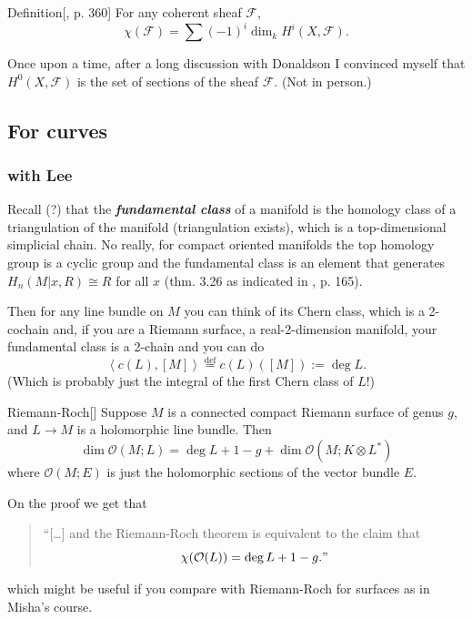 \begin{thing4}{Definition}[\cite{hart}, p. 360]\label{def:}\leavevmode
For any coherent sheaf \(\mathcal{F}\),
\[\chi(\mathcal{F})=\sum(-1)^i\dim_kH^{i}(X,\mathcal{F}).\]
\end{thing4}

\begin{remark}\leavevmode
Once upon a time, after a long discussion with Donaldson I convinced myself that \(H^{0}(X,\mathcal{F})\) is the set of sections of the sheaf \(\mathcal{F}\). (Not in person.)
\end{remark}

\subsection{For curves}

\subsubsection{with Lee}

Recall (?) that the \textit{\textbf{fundamental class}} of a manifold is the homology class of a triangulation of the manifold (triangulation exists), which is a top-dimensional simplicial chain. No really, for compact oriented manifolds the top homology group is a cyclic group and the fundamental class is an element that generates \(H_n(M|x,R)\cong R\) for all \(x\) (thm. 3.26 \cite{hat} as indicated in \cite{lec}, p. 165).

Then for any line bundle on  \(M\) you can think of its Chern class, which is a 2-cochain and, if you are a Riemann surface, a real-2-dimension manifold, your fundamental class is a 2-chain and you can do
\[\left<c(L),[M]\right>\overset{\operatorname{def}}{=}c(L)([M]):=\operatorname{deg}L.\]
(Which is probably just the integral of the first Chern class of \(L\)!)
\begin{thing7}{Riemann-Roch}[\cite{lec}]\leavevmode
Suppose \(M\) is a connected compact Riemann surface of genus \(g\), and \(L \to M\) is a holomorphic line bundle. Then 
\[\dim \mathcal{O}(M;L)=\operatorname{deg}L+1-g+\dim\mathcal{O}(M;K\otimes L^*)\]
where \(\mathcal{O}(M;E)\) is just the holomorphic sections of the vector bundle \(E\).
\end{thing7}
\begin{remark}\leavevmode
On the proof we get that
\begin{quotation}
	``[…] and the Riemann-Roch theorem is equivalent to the claim that
	\[\chi(\mathcal{O}(L))=\operatorname{deg}L+1-g."\]
\end{quotation}
which might be useful if you compare with Riemann-Roch for surfaces as in Misha's course.
\end{remark}
